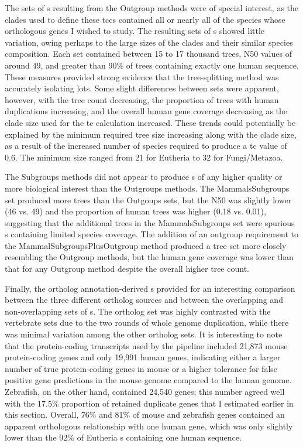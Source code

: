 The sets of \subtr{}s resulting from the Outgroup methods were of
special interest, as the clades used to define these \acp{tcc}
contained all or nearly all of the \mammln species whose orthologous
genes I wished to study. The resulting sets of \subtr{}s showed little
variation, owing perhaps to the large sizes of the clades and their
similar species composition. Each \subtr set contained between 15 to
17 thousand trees, N50 values of around 49, and greater than 90\% of
trees containing exactly one human sequence. These measures provided
strong evidence that the tree-splitting method was accurately
isolating \mammln \acp{lot}.  Some slight differences between \subtr
sets were apparent, however, with the tree count decreasing, the
proportion of trees with human duplications increasing, and the
overall human gene coverage decreasing as the clade size used for the
\ac{tc} calculation increased. These trends could potentially be
explained by the minimum required tree size increasing along with the
clade size, as a result of the increased number of species required to
produce a \ac{tc} value of 0.6. The minimum \subtr size ranged from 21
for Eutheria to 32 for Fungi/Metazoa.

The Subgroups methods did not appear to produce \subtr{}s of any
higher quality or more biological interest than the Outgroups
methods. The MammalsSubgroups set produced more trees than the
Outgoups sets, but the N50 was slightly lower (46 vs. 49) and the
proportion of \zcop human trees was higher (0.18 vs. 0.01), suggesting
that the additional trees in the MammalsSubgroups set were spurious
\subtr{}s containing limited species coverage. The addition of an
outgroup requirement to the MammalSubgroupsPlusOutgroup method
produced a tree set more closely resembling the Outgroup methods, but
the human gene coverage was lower than that for any Outgroup method
despite the overall higher tree count.

Finally, the ortholog annotation-derived \subtr{}s provided for an
interesting comparison between the three different ortholog sources
and between the overlapping and non-overlapping sets of \subtr{}s. The
 ortholog set was highly contrasted with the
vertebrate sets due to the two rounds of whole genome duplication,
while there was minimal variation among the other ortholog sets. It is
interesting to note that the protein-coding transcripts used by the
\cmp pipeline included 21,873 mouse protein-coding genes and only
19,991 human genes, indicating either a larger number of true
protein-coding genes in mouse or a higher tolerance for false positive
gene predictions in the mouse genome compared to the human
genome. Zebrafish, on the other hand, contained 24,540 genes; this
number agreed well with the 17.5\% proportion of retained duplicate
genes that I estimated earlier in this section. Overall, 76\% and 81\%
of mouse and zebrafish genes contained an apparent orthologous
relationship with one human gene, which was only slightly lower than
the 92\% of Eutheria \subtr{}s containing one human sequence.

